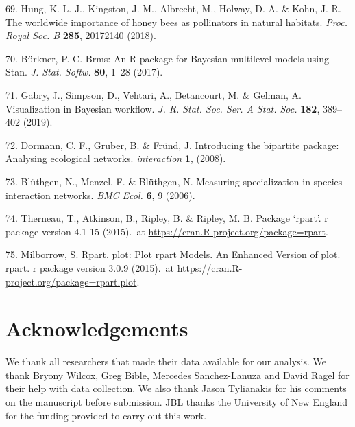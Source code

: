 \documentclass[12pt,a4paper,]{article}
\begin{document}
\hypertarget{ref-hung2018}{}
69. Hung, K.-L. J., Kingston, J. M., Albrecht, M., Holway, D. A. \&
Kohn, J. R. The worldwide importance of honey bees as pollinators in
natural habitats. \emph{Proc. Royal Soc. B} \textbf{285}, 20172140
(2018).

\hypertarget{ref-burkner2017}{}
70. Bürkner, P.-C. Brms: An R package for Bayesian multilevel models
using Stan. \emph{J. Stat. Softw.} \textbf{80}, 1--28 (2017).

\hypertarget{ref-gabry2019}{}
71. Gabry, J., Simpson, D., Vehtari, A., Betancourt, M. \& Gelman, A.
Visualization in Bayesian workflow. \emph{J. R. Stat. Soc. Ser. A Stat.
Soc.} \textbf{182}, 389--402 (2019).

\hypertarget{ref-dormann2008}{}
72. Dormann, C. F., Gruber, B. \& Fründ, J. Introducing the bipartite
package: Analysing ecological networks. \emph{interaction} \textbf{1},
(2008).

\hypertarget{ref-bluthgen2006}{}
73. Blüthgen, N., Menzel, F. \& Blüthgen, N. Measuring specialization in
species interaction networks. \emph{BMC Ecol.} \textbf{6}, 9 (2006).

\hypertarget{ref-therneau2015}{}
74. Therneau, T., Atkinson, B., Ripley, B. \& Ripley, M. B. Package
`rpart'. r package version 4.1-15 (2015).~at
\href{https://CRAN.R-project.org/package=rpart}{https://cran.R-project.org/package=rpart}.

\hypertarget{ref-milborrow2015}{}
75. Milborrow, S. Rpart. plot: Plot rpart Models. An Enhanced Version of
plot. rpart. r package version 3.0.9 (2015).~at
\href{https://CRAN.R-project.org/package=rpart.plot}{https://cran.R-project.org/package=rpart.plot}.

\section{Acknowledgements}\label{acknowledgements}

We thank all researchers that made their data available for our
analysis. We thank Bryony Wilcox, Greg Bible, Mercedes Sanchez-Lanuza
and David Ragel for their help with data collection. We also thank Jason
Tylianakis for his comments on the manuscript before submission. JBL
thanks the University of New England for the funding provided to carry
out this work.
\end{document}
